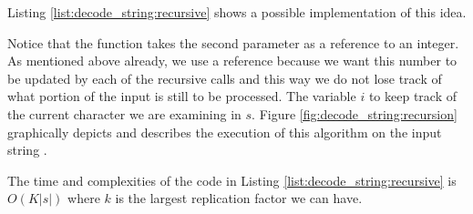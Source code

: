 Listing \ref{list:decode_string:recursive} shows a possible implementation of this idea. 




Notice that the function  takes the second parameter 
as a reference to an integer.
As mentioned above already, we use a reference because we want this number 
to be updated by each of the recursive calls and this way we do not lose track of what portion of the input is still to be processed.
The variable $i$ to keep track of the current character we are examining in $s$. 
Figure \ref{fig:decode_string:recursion} graphically depicts and describes the execution 
of this algorithm  on the input string .

The time and complexities of the code in Listing \ref{list:decode_string:recursive} is $O(K|s|)$ where $k$ is the largest replication factor we can have.

